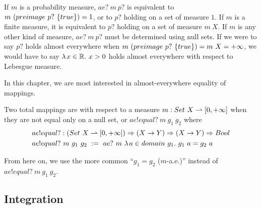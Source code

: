 If $m$ is a probability measure, $ae?~m~p?$ is equivalent to $m~(preimage~p?~\{{true}\}) = 1$, or to $p?$ holding on a set of measure $1$.
If $m$ is a finite measure, it is equivalent to $p?$ holding on a set of measure $m~X$.
If $m$ is any other kind of measure, $ae?~m~p?$ must be determined using null sets.
If we were to say $p?$ holds almost everywhere when $m~(preimage~p?~\{{true}\}) = m~X = +\infty$, we would have to say $\lambda\mspace{2mu}{x \in \mathbb{R}}\ldotp\, x > 0$ holds almost everywhere with respect to Lebesgue measure.


In this chapter, we are most interested in almost-everywhere equality of mappings.

\begin{definition}
\label{def:almost-everywhere-equality}
Two total mappings are  with respect to a measure $m : Set~X \rightharpoonup [0,+\infty]$ when they are not equal only on a null set, or $ae!equal?~m~g_1~g_2$ where
\begin{equation}
\begin{aligned}
	&ae!equal? : (Set~X \rightharpoonup [0,+\infty]) \Rightarrow (X \to Y) \Rightarrow (X \to Y) \Rightarrow Bool \\
	&ae!equal?~m~g_1~g_2\ :=\ ae?~m~\lambda\mspace{2mu}{a \in domain~g_1}\ldotp\, g_1~a = g_2~a
\end{aligned}
\end{equation}
\end{definition}

From here on, we use the more common ``$g_1 = g_2$ ($m$-a.e.)'' instead of $ae!equal?~m~g_1~g_2$.

\subsection{Integration}

